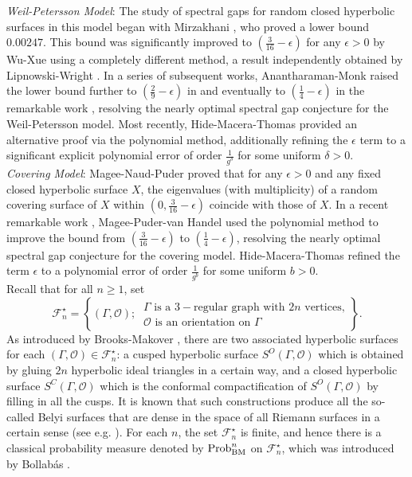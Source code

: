 \documentclass{amsart}
\theoremstyle{plain}
\theoremstyle{definition}
\theoremstyle{remark}
\begin{document}
\noindent \emph{Weil-Petersson Model}: The study of spectral gaps for random closed hyperbolic surfaces in this model began with Mirzakhani \cite{Mir13}, who proved a lower bound $0.00247$. This bound was significantly improved to $\left(\frac{3}{16}-\epsilon\right)$ for any $\epsilon>0$ by Wu-Xue \cite{WX22} using a completely different method, a result independently obtained by Lipnowski-Wright \cite{LW24}. In a series of subsequent works, Anantharaman-Monk raised the lower bound further to $\left(\frac{2}{9}-\epsilon\right)$ in \cite{AM23} and eventually to $\left(\frac{1}{4}-\epsilon\right)$ in the remarkable work \cite{AM25}, resolving the nearly optimal spectral gap conjecture for the Weil-Petersson model. Most recently, Hide-Macera-Thomas \cite{HMT25} provided an alternative proof via the polynomial method, additionally refining the $\epsilon$ term to a significant explicit polynomial error of order $\frac{1}{g^\delta}$ for some uniform $\delta>0$.\\


\noindent \emph{Covering Model}: Magee-Naud-Puder \cite{MNP22} proved that for any $\epsilon>0$ and any fixed closed hyperbolic surface $X$, the eigenvalues (with multiplicity) of a random covering surface of $X$ within $\left(0, \frac{3}{16}-\epsilon\right)$ coincide with those of $X$. In a recent remarkable work \cite{MPvH25}, Magee-Puder-van Handel used the polynomial method to improve the bound from $\left(\frac{3}{16}-\epsilon\right)$ to $\left(\frac{1}{4}-\epsilon\right)$, resolving the nearly optimal spectral gap conjecture for the covering model. Hide-Macera-Thomas \cite{HMTcov} refined the term $\epsilon$ to a polynomial error of order $\frac{1}{g^b}$ for some uniform $b>0$.\\


Recall that for all $n\geq 1$, set
$$\mathcal{F}_n^\star=\left\{(\Gamma,\mathcal{O});\ \begin{matrix}
    \Gamma\text{ is a $3-$regular graph with $2n$ vertices,}\\ \mathcal{O}\text{ is an orientation on }\Gamma
\end{matrix}\right\}.$$
As introduced by Brooks-Makover \cite{BM04}, there are two associated hyperbolic surfaces for each $(\Gamma,\mathcal{O})\in\mathcal{F}_n^\star$: a cusped hyperbolic surface $S^O(\Gamma,\mathcal{O})$ which is obtained by gluing $2n$ hyperbolic ideal triangles in a certain way, and a closed hyperbolic surface  $S^C(\Gamma,\mathcal{O})$ which is the conformal compactification of $S^O(\Gamma,\mathcal{O})$ by filling in all the cusps. It is known that such
constructions produce all the so-called Belyi surfaces that are dense in the space of all Riemann surfaces in a certain sense (see e.g. \cite{Be79, Ga06}). For each $n$, the set $\mathcal{F}_n^\star$ is finite, and hence there is a classical probability measure denoted by $\textnormal{Prob}_{\textnormal{BM}}^n$ on $\mathcal{F}_n^\star$, which was introduced by Bollab\'as \cite{Bollobas-iso}.
\end{document}
